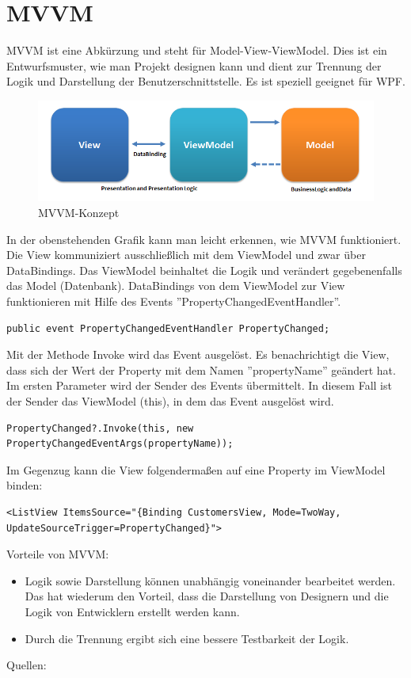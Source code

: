 \section{MVVM}
MVVM ist eine Abkürzung und steht für Model-View-ViewModel. Dies ist ein Entwurfsmuster, wie man Projekt designen kann und dient zur Trennung der Logik und Darstellung der Benutzerschnittstelle. Es ist speziell geeignet für WPF. 
\begin{figure}[H]
\begin{center}
	\includegraphics[scale=.7]{images/MVVMPattern.png}
\end{center}
	\caption{MVVM-Konzept}
	\label{fig:sample}
\end{figure}
In der obenstehenden Grafik kann man leicht erkennen, wie MVVM funktioniert. Die View kommuniziert ausschließlich mit dem ViewModel und zwar über DataBindings. Das ViewModel beinhaltet die Logik und verändert gegebenenfalls das Model (Datenbank).
\newline
DataBindings von dem ViewModel zur View funktionieren mit Hilfe des Events ''PropertyChangedEventHandler''. 
\begin {lstlisting}
public event PropertyChangedEventHandler PropertyChanged;
\end{lstlisting}
Mit der Methode Invoke wird das Event ausgelöst. Es benachrichtigt die View, dass sich der Wert der Property mit dem Namen ''propertyName'' geändert hat. Im ersten Parameter wird der Sender des Events übermittelt. In diesem Fall ist der Sender das ViewModel (this), in dem das Event ausgelöst wird.
\begin{lstlisting}
PropertyChanged?.Invoke(this, new PropertyChangedEventArgs(propertyName));
\end{lstlisting}
Im Gegenzug kann die View folgendermaßen auf eine Property im ViewModel binden:
\begin{lstlisting}
<ListView ItemsSource="{Binding CustomersView, Mode=TwoWay, UpdateSourceTrigger=PropertyChanged}">
\end{lstlisting}
Vorteile von MVVM:
\begin{itemize}
\item Logik sowie Darstellung können unabhängig voneinander bearbeitet werden. Das hat wiederum den Vorteil, dass die Darstellung von Designern und die Logik von Entwicklern erstellt werden kann.
\item Durch die Trennung ergibt sich eine bessere Testbarkeit der Logik.
\end{itemize}
Quellen: \cite{wikipedia_model_2017}
